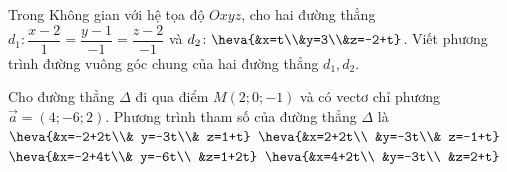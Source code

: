 \begin{vd}%
	Trong Không gian với hệ tọa độ $Oxyz$, cho hai đường thẳng $d_1 \colon \dfrac{x-2}{1}=\dfrac{y-1}{-1}=\dfrac{z-2}{-1}$ và $d_2 \colon \heva{&x=t\\&y=3\\&z=-2+t}$. Viết phương trình đường vuông góc chung của hai đường thẳng $d_1, d_2$.
\end{vd}
\baitaptn
\setcounter{ex}{0}

\begin{ex}
	Cho đường thẳng $\Delta$ đi qua điểm $M\left(2;0;-1\right)$ và có vectơ chỉ phương $\overrightarrow{a}=\left(4;-6;2\right)$. Phương trình tham số của đường thẳng $\Delta$ là
	\choice
	{$\heva{&x=-2+2t\\& y=-3t\\& z=1+t}$}
	{$\heva{&x=2+2t\\ &y=-3t\\& z=-1+t}$}
	{$\heva{&x=-2+4t\\& y=-6t\\ &z=1+2t}$}
	{\True $\heva{&x=4+2t\\ &y=-3t\\ &z=2+t}$}
	\loigiai{
	}
\end{ex}

